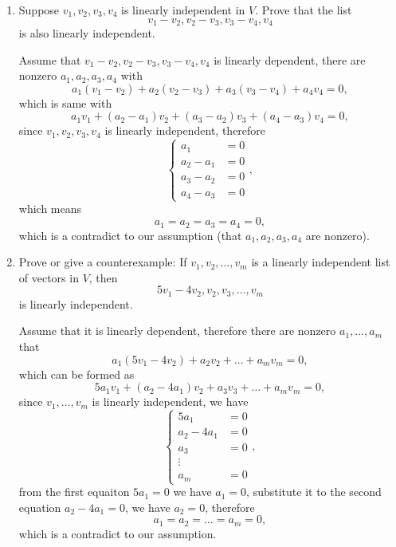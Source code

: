 \begin{enumerate}
\begin{solution}
        \end{solution}
    \item Suppose $v_1, v_2, v_3, v_4$ is linearly independent in $V$. Prove that the list 
        \[ v_1-v_2, v_2-v_3,v_3-v_4,v_4\]
        is also linearly independent.
        \begin{solution}
            Assume that $ v_1-v_2, v_2-v_3,v_3-v_4,v_4$ is linearly dependent, there are nonzero $a_1, a_2, a_3, a_4$ with 
            \[ a_1 (v_1-v_2) + a_2(v_2-v_3) + a_3(v_3-v_4) + a_4v_4 = 0,\]
            which is same with
            \[ a_1v_1 + (a_2-a_1)v_2 + (a_3-a_2)v_3 + (a_4-a_3)v_4 = 0,\]
            since $v_1, v_2, v_3, v_4$ is linearly independent, therefore 
            \[ 
                \begin{cases}
                    a_1 &= 0 \\
                    a_2 - a_1 &= 0 \\
                    a_3 - a_2 &= 0 \\
                    a_4 - a_3 &= 0
                \end{cases},
            \]
            which means 
            \[ a_1 = a_2 = a_3 = a_4 = 0 ,\]
            which is a contradict to our assumption (that $a_1, a_2, a_3, a_4$ are nonzero).
        \end{solution}
    \item Prove or give a counterexample: If $v_1, v_2, \ldots, v_m$ is a linearly independent list of vectors in $V$, then 
        \[5v_1-4v_2, v_2,v_3,\ldots, v_m\]
        is linearly independent.
        \begin{solution}
            Assume that it is linearly dependent, therefore there are nonzero $a_1, \ldots, a_m$ that 
            \[ a_1(5v_1-4v_2) + a_2v_2 + \dots + a_mv_m = 0 ,\]
            which can be formed as 
            \[ 5a_1v_1 + (a_2-4a_1)v_2 + a_3v_3 + \dots + a_mv_m = 0,\]
            since $v_1, \ldots, v_m$ is linearly independent, we have 
            \[
                \begin{cases}
                    5a_1 &= 0 \\
                    a_2 - 4a_1 &= 0 \\
                    a_3 &= 0 \\
                    \vdots \\
                    a_m &= 0
                \end{cases},
            \]
            from the first equaiton $5a_1 = 0$ we have $a_1=0$, substitute it to the second equation $a_2-4a_1 = 0$, we have $a_2 = 0$, 
            therefore 
            \[ a_1 = a_2 = \dots = a_m = 0,\]
            which is a contradict to our assumption.


\end{solution}
\end{enumerate}
